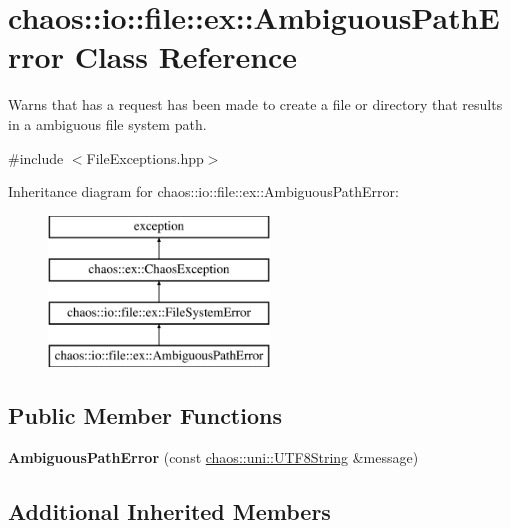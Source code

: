 \hypertarget{classchaos_1_1io_1_1file_1_1ex_1_1_ambiguous_path_error}{\section{chaos\-:\-:io\-:\-:file\-:\-:ex\-:\-:Ambiguous\-Path\-Error Class Reference}
\label{classchaos_1_1io_1_1file_1_1ex_1_1_ambiguous_path_error}
}


Warns that has a request has been made to create a file or directory that results in a ambiguous file system path.  




{\ttfamily \#include $<$File\-Exceptions.\-hpp$>$}

Inheritance diagram for chaos\-:\-:io\-:\-:file\-:\-:ex\-:\-:Ambiguous\-Path\-Error\-:\begin{figure}[H]
\begin{center}
\leavevmode
\includegraphics[height=4.000000cm]{classchaos_1_1io_1_1file_1_1ex_1_1_ambiguous_path_error}
\end{center}
\end{figure}
\subsection*{Public Member Functions}
\begin{DoxyCompactItemize}
\item 
\hypertarget{classchaos_1_1io_1_1file_1_1ex_1_1_ambiguous_path_error_ac10d0f67ac33f603226c32bfcd98253d}{{\bfseries Ambiguous\-Path\-Error} (const \hyperlink{classchaos_1_1uni_1_1_u_t_f8_string}{chaos\-::uni\-::\-U\-T\-F8\-String} \&message)}\label{classchaos_1_1io_1_1file_1_1ex_1_1_ambiguous_path_error_ac10d0f67ac33f603226c32bfcd98253d}

\end{DoxyCompactItemize}
\subsection*{Additional Inherited Members}


